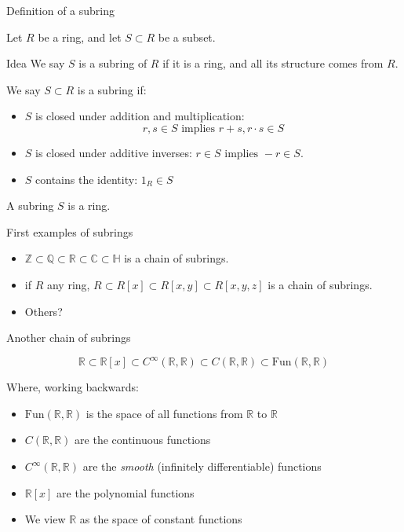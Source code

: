 \documentclass{beamer}
\begin{document}
\begin{frame}{Definition of a subring}

  Let $R$ be a ring, and let $S\subset R$ be a subset.
  
  \begin{block}{Idea}
    We say $S$ is a subring of $R$ if it is a ring, and all its structure comes from $R$.
  \end{block}

  \begin{definition}
We say $S\subset R$ is a subring if:
    \begin{itemize}
\item $S$ is closed under addition and multiplication:
$$r,s\in S \text{ implies } r+s, r\cdot s\in S$$
\item $S$ is closed under additive inverses: $r\in S \text{ implies } -r\in S$.
\item $S$ contains the identity: $1_R\in S$
\end{itemize}
\end{definition}

  \begin{lemma} A subring $S$ is a ring.
    \end{lemma}
  

\end{frame}


\begin{frame}{First examples of subrings}

\begin{itemize}
\item $\mathbb{Z}\subset\mathbb{Q}\subset \mathbb{R}\subset\mathbb{C}\subset\mathbb{H}$ is a chain of subrings.
\item if $R$ any ring, $R\subset R[x]\subset R[x,y]\subset R[x,y,z]$ is a chain of subrings.
\item Others?
\end{itemize}
\end{frame}

\begin{frame}{Another chain of subrings}

$$\mathbb{R}\subset \mathbb{R}[x]\subset C^\infty(\mathbb{R},\mathbb{R})\subset C(\mathbb{R},\mathbb{R}) \subset \textrm{Fun}(\mathbb{R},\mathbb{R})$$

Where, working backwards:
\begin{itemize}
\item $\textrm{Fun}(\mathbb{R},\mathbb{R})$ is the space of all functions from $\mathbb{R}$ to $\mathbb{R}$
\item $C(\mathbb{R},\mathbb{R})$ are the continuous functions
\item $C^\infty(\mathbb{R},\mathbb{R})$ are the \emph{smooth} (infinitely differentiable) functions
\item $\mathbb{R}[x]$ are the polynomial functions
\item We view $\mathbb{R}$ as the space of constant functions 
\end{itemize}

\end{frame}
\end{document}
